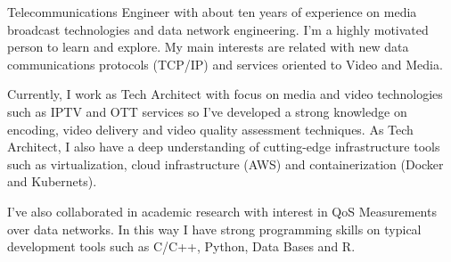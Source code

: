 \par{
Telecommunications Engineer with about ten years of experience on media broadcast technologies and data network engineering. I'm a highly motivated person to learn and explore. My main interests are related with new data communications protocols (TCP/IP) and services oriented to Video and Media.

Currently, I work as Tech Architect with focus on media and video technologies such as IPTV and OTT services so I've developed a strong knowledge on encoding, video delivery and video quality assessment techniques. As Tech Architect, I also have a deep understanding of cutting-edge infrastructure tools such as virtualization, cloud infrastructure (AWS) and containerization (Docker and Kubernets).

I've also collaborated in academic research with interest in QoS Measurements over data networks. In this way I have strong programming skills on typical development tools such as C/C++, Python, Data Bases and R.
}